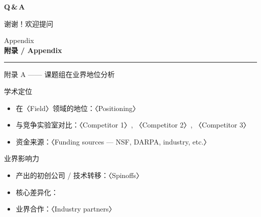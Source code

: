 \begin{frame}[plain,c]
  \centering
  {\fontsize{40}{44}\selectfont\bfseries\color{emph} Q\,\&\,A}

  \deckgap
  {\Large 谢谢！欢迎提问}

  \deckgap
  {\color{sustechgrey}\footnotesize \titlemetaline}
\end{frame}

\appendix

\begin{frame}[plain,c]
  \centering
  {\color{sustechgrey}\large Appendix}\\[0.6em]
  {\Huge\bfseries 附录 / Appendix}\\[0.9em]
  {\color{emph}\rule{2cm}{2pt}}
\end{frame}

\begin{frame}{附录 A —— 课题组在业界地位分析}
  \begin{block}{学术定位}
    \begin{itemize}
      \item {} 在〈Field〉领域的地位：〈Positioning〉
      \item 与竞争实验室对比：〈Competitor 1〉, 〈Competitor 2〉, 〈Competitor 3〉
      \item 资金来源：〈Funding sources — NSF, DARPA, industry, etc.〉
    \end{itemize}
  \end{block}
  \tightgap
  \begin{block}{业界影响力}
    \begin{itemize}
      \item 产出的初创公司 / 技术转移：〈Spinoffs〉
      \item 核心差异化：
      \item 业界合作：〈Industry partners〉
    \end{itemize}
  \end{block}
\end{frame}

